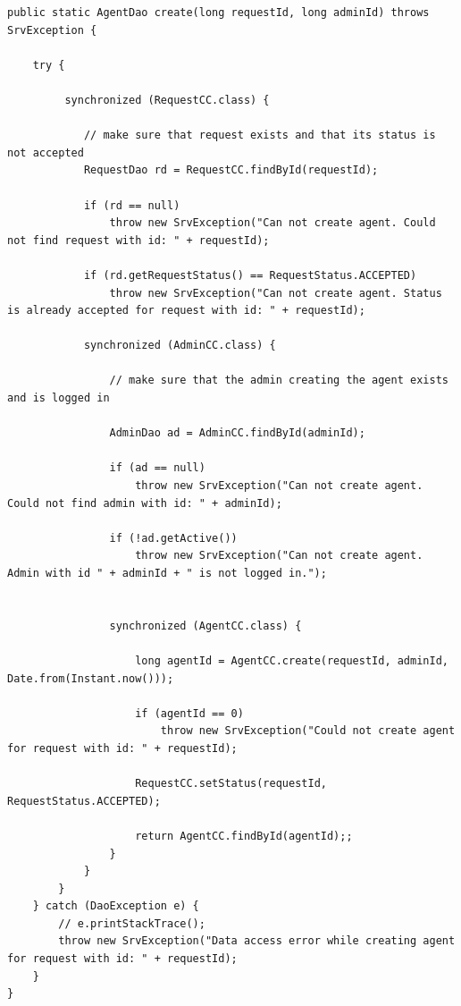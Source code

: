 \documentclass[a4paper,11pt]{article}
\begin{document}
\begin{sloppypar}
\begin{lstlisting}
public static AgentDao create(long requestId, long adminId) throws SrvException {

    try {

         synchronized (RequestCC.class) {

            // make sure that request exists and that its status is not accepted
            RequestDao rd = RequestCC.findById(requestId);

            if (rd == null)
                throw new SrvException("Can not create agent. Could not find request with id: " + requestId);

            if (rd.getRequestStatus() == RequestStatus.ACCEPTED)
                throw new SrvException("Can not create agent. Status is already accepted for request with id: " + requestId);

            synchronized (AdminCC.class) {

                // make sure that the admin creating the agent exists and is logged in

                AdminDao ad = AdminCC.findById(adminId);

                if (ad == null)
                    throw new SrvException("Can not create agent. Could not find admin with id: " + adminId);

                if (!ad.getActive())
                    throw new SrvException("Can not create agent. Admin with id " + adminId + " is not logged in.");


                synchronized (AgentCC.class) {

                    long agentId = AgentCC.create(requestId, adminId, Date.from(Instant.now()));

                    if (agentId == 0)
                        throw new SrvException("Could not create agent for request with id: " + requestId);

                    RequestCC.setStatus(requestId, RequestStatus.ACCEPTED);

                    return AgentCC.findById(agentId);;
                }
            }
        }
    } catch (DaoException e) {
        // e.printStackTrace();
        throw new SrvException("Data access error while creating agent for request with id: " + requestId);
    }
}
\end{lstlisting}


\end{sloppypar}
\end{document}
